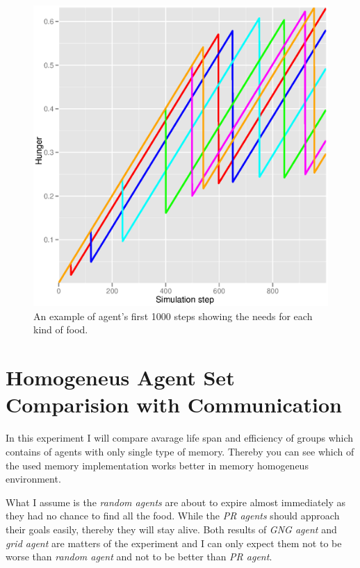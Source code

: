 \begin{figure}[h!]
  \centering                                
  \includegraphics[scale=0.4]{diagrams/experiments/single_agent.eps}    
  \caption{An example of agent's first 1000 steps showing the needs for each kind of food.}
  \label{experiments:singleagent}
\end{figure}

\section{Homogeneus Agent Set Comparision with Communication}

In this experiment I will compare avarage life span and efficiency of groups which contains of agents with only single type of memory. Thereby you can see which of the used memory implementation works better in memory homogeneus environment.

What I assume is the \emph{random agents} are about to expire almost immediately as they had no chance to find all the food. While the \emph{PR agents} should approach their goals easily, thereby they will stay alive. Both results of \emph{GNG agent} and \emph{grid agent} are matters of the experiment and I can only expect them not to be worse than \emph{random agent} and not to be better than \emph{PR agent}.     


